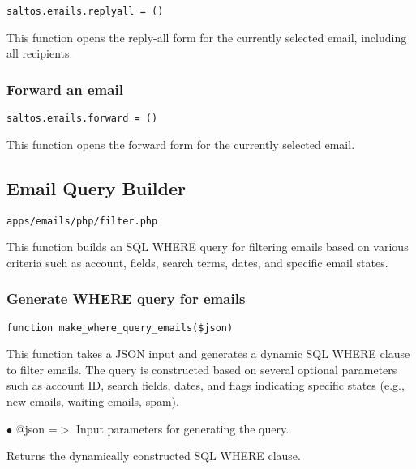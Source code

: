 \documentclass[a4paper]{article}
\begin{document}
\begin{lstlisting}
saltos.emails.replyall = ()
\end{lstlisting}

This function opens the reply-all form for the currently selected email, including all recipients.

\hypertarget{toc69}{}
\subsubsection{Forward an email}

\begin{lstlisting}
saltos.emails.forward = ()
\end{lstlisting}

This function opens the forward form for the currently selected email.

\hypertarget{toc70}{}
\subsection{Email Query Builder}

\begin{lstlisting}
apps/emails/php/filter.php
\end{lstlisting}

This function builds an SQL WHERE query for filtering emails based on various criteria
such as account, fields, search terms, dates, and specific email states.

\hypertarget{toc71}{}
\subsubsection{Generate WHERE query for emails}

\begin{lstlisting}
function make_where_query_emails($json)
\end{lstlisting}

This function takes a JSON input and generates a dynamic SQL WHERE clause to filter emails.
The query is constructed based on several optional parameters such as account ID, search fields,
dates, and flags indicating specific states (e.g., new emails, waiting emails, spam).

\begin{compactitem}
\item[\color{myblue}$\bullet$] @json =$>$ Input parameters for generating the query.
\end{compactitem}

Returns the dynamically constructed SQL WHERE clause.
\end{document}
